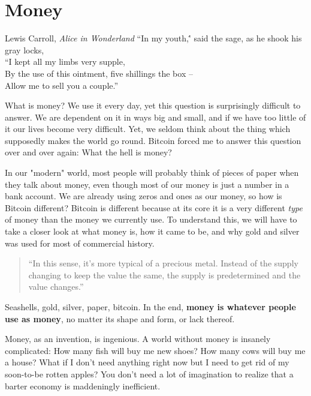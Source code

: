 \chapter{Money}
\label{les:11}

\begin{chapquote}{Lewis Carroll, \textit{Alice in Wonderland}}
``In my youth,\'' said the sage, as he shook his gray locks, \\
``I kept all my limbs very supple, \\
By the use of this ointment, five shillings the box -- \\
Allow me to sell you a couple.''
\end{chapquote}

What is money? We use it every day, yet this question is surprisingly
difficult to answer. We are dependent on it in ways big and small, and
if we have too little of it our lives become very difficult. Yet, we
seldom think about the thing which supposedly makes the world go round.
Bitcoin forced me to answer this question over and over again: What the
hell is money?

In our "modern" world, most people will probably think of pieces of
paper when they talk about money, even though most of our money is just
a number in a bank account. We are already using zeros and ones as our
money, so how is Bitcoin different? Bitcoin is different because at its
core it is a very different \textit{type} of money than the money we currently
use. To understand this, we will have to take a closer look at what
money is, how it came to be, and why gold and silver was used for most
of commercial history.

\begin{quotation}
``In this sense, it's more typical of a precious metal. Instead of the
supply changing to keep the value the same, the supply is
predetermined and the value changes.''
\end{quotation}

Seashells, gold, silver, paper, bitcoin. In the end, \textbf{money is whatever
people use as money}, no matter its shape and form, or lack thereof.

Money, as an invention, is ingenious. A world without money is insanely
complicated: How many fish will buy me new shoes? How many cows will buy
me a house? What if I don't need anything right now but I need to get
rid of my soon-to-be rotten apples? You don't need a lot of imagination
to realize that a barter economy is maddeningly inefficient.

